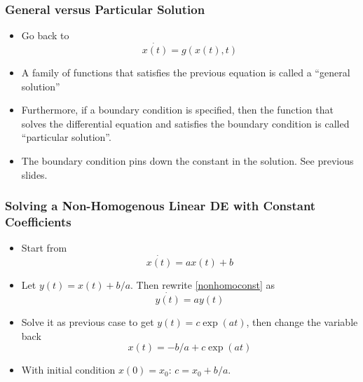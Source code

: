 \documentclass[11pt]{beamer}
\begin{document}

\begin{frame}
\frametitle{General versus Particular Solution}
\begin{itemize}\itemsep2ex
	\item Go back to
	\begin{equation*}
	\dot{x(t)} = g(x(t),t)
	\end{equation*}
	\item A family of functions that satisfies the previous equation is called a ``general solution''
	\item Furthermore, if a boundary condition is specified, then the function that solves the differential equation and satisfies the boundary condition is called ``particular solution''.
	\item The boundary condition pins down the constant in the solution. See previous slides.
\end{itemize}
\end{frame}


\begin{frame}
\frametitle{Solving a Non-Homogenous Linear DE with Constant Coefficients}
\begin{itemize}\itemsep2ex
	\item Start from
	\begin{equation}
	\label{nonhomoconst}
	\dot{x(t)} = a x(t) + b
	\end{equation}
	\item Let $y(t) = x(t) + b/a$. Then rewrite \eqref{nonhomoconst} as
	\begin{equation*}
	\dot{y(t)} = a y(t)
	\end{equation*}
	\item Solve it as previous case to get $y(t) = c \exp(a t)$, then change the variable back
	\begin{equation*}
	x(t) = -b/a + c \exp(a t)
	\end{equation*}
	\item With initial condition $x(0)=x_0$: $c = x_0 + b/a$.
\end{itemize}
\end{frame}

\end{document}
